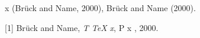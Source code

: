 \documentclass[11pt]{article}
\date{\today}
\title{}
\begin{document}
\tableofcontents

x (Br{\"u}ck {and} \alpha{} Name, 2000), Br{\"u}ck {and} \alpha{} Name (2000).

\noindent
{[}1] Br{\"u}ck {and} \alpha{} Name, \emph{T {\TeX} \alpha{} x}, P {x} \beta{}, 2000.
\end{document}
